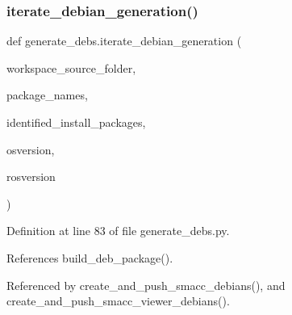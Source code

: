 \subsubsection{\texorpdfstring{iterate\+\_\+debian\+\_\+generation()}{iterate\_debian\_generation()}}
{\footnotesize\ttfamily def generate\+\_\+debs.\+iterate\+\_\+debian\+\_\+generation (\begin{DoxyParamCaption}\item[{}]{workspace\+\_\+source\+\_\+folder,  }\item[{}]{package\+\_\+names,  }\item[{}]{identified\+\_\+install\+\_\+packages,  }\item[{}]{osversion,  }\item[{}]{rosversion }\end{DoxyParamCaption})}



Definition at line 83 of file generate\+\_\+debs.\+py.



References build\+\_\+deb\+\_\+package().



Referenced by create\+\_\+and\+\_\+push\+\_\+smacc\+\_\+debians(), and create\+\_\+and\+\_\+push\+\_\+smacc\+\_\+viewer\+\_\+debians().


